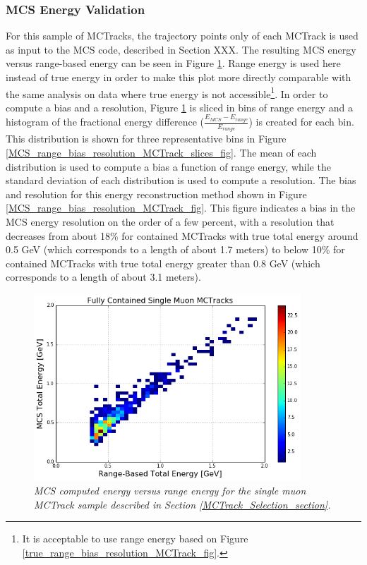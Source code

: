 \subsubsection{MCS Energy Validation}\label{MCS_Energy_Validation_MCTrack_section}
For this sample of {\sc MCTracks}, the trajectory points only of each {\sc MCTrack} is used as input to the MCS code, described in Section XXX. The resulting MCS energy versus range-based energy can be seen in Figure \ref{MCS_range_energy_MCTrack_fig}. Range energy is used here instead of true energy in order to make this plot more directly comparable with the same analysis on data where true energy is not accessible\footnote{It is acceptable to use range energy based on Figure \ref{true_range_bias_resolution_MCTrack_fig}.}. In order to compute a bias and a resolution, Figure \ref{MCS_range_energy_MCTrack_fig} is sliced in bins of range energy and a histogram of the fractional energy difference ($\frac{E_{MCS} - E_{range}}{E_{range}}$) is created for each bin. This distribution is shown for three representative bins in Figure \ref{MCS_range_bias_resolution_MCTrack_slices_fig}. The mean of each distribution is used to compute a bias a function of range energy, while the standard deviation of each distribution is used to compute a resolution. The bias and resolution for this energy reconstruction method shown in Figure \ref{MCS_range_bias_resolution_MCTrack_fig}. This figure indicates a bias in the MCS energy resolution on the order of a few percent, with a resolution that decreases from about 18\% for contained {\sc MCTracks} with true total energy around 0.5 GeV (which corresponds to a length of about 1.7 meters) to below 10\% for contained {\sc MCTracks} with true total energy greater than 0.8 GeV (which corresponds to a length of about 3.1 meters).


\begin{figure}[h!]
\begin{center}
\includegraphics[width=100mm]{Figures/MCS_range_comparison_MCTracks.png}
\end{center}
\caption{\textit{MCS computed energy versus range energy for the single muon {\sc MCTrack} sample described in Section \ref{MCTrack_Selection_section}.}}
\label{MCS_range_energy_MCTrack_fig}
\end{figure}

